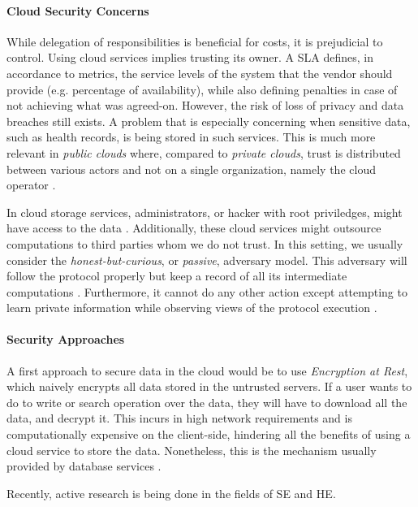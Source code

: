 \paragraph{Cloud Security Concerns} While delegation of responsibilities is beneficial for costs, it is prejudicial to control. Using cloud services implies trusting its owner. A \gls{SLA} defines, in accordance to metrics, the service levels of the system that the vendor should provide (e.g. percentage of availability), while also defining penalties in case of not achieving what was agreed-on. However, the risk of loss of privacy and data breaches still exists. A problem that is especially concerning when sensitive data, such as health records, is being stored in such services. This is much more relevant in \emph{public clouds} where, compared to \emph{private clouds}, trust is distributed between various actors and not on a single organization, namely the cloud operator \autocite{Carroll2011-me}.

In cloud storage services, administrators, or hacker with root priviledges, might have access to the data \autocite{Bosch2014-eb}. Additionally, these cloud services might outsource computations to third parties whom we do not trust. In this setting, we usually consider the \emph{honest-but-curious}, or \emph{passive}, adversary model. This adversary will follow the protocol properly but keep a record of all its intermediate computations \autocite{Goldreich2001-sr}. Furthermore, it cannot do any other action except attempting to learn private information while observing views of the protocol execution \autocite{Evans2018-it}.

\paragraph{Security Approaches} A first approach to secure data in the cloud would be to use \emph{Encryption at Rest}, which naively encrypts all data stored in the untrusted servers. If a user wants to do to write or search operation over the data, they will have to download all the data, and decrypt it. This incurs in high network requirements and is computationally expensive on the client-side, hindering all the benefits of using a cloud service to store the data. Nonetheless, this is the mechanism usually provided by database services \autocite{Oracle_Corporation_andor_its_affiliates_undated-rt, Oracle_Corporation_andor_its_affiliates_undated-lr, MongoDB_Inc_undated-mz}.

Recently, active research is being done in the fields of \gls{SE} and \gls{HE}.

